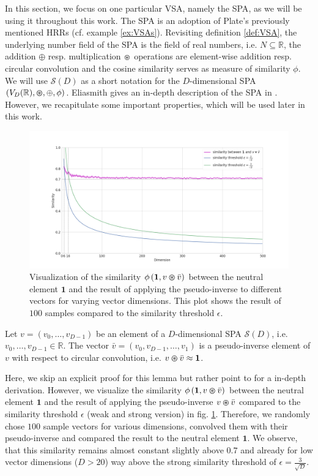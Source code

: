 In this section, we focus on one particular \ac{VSA}, namely the \ac{SPA}, as we will be using it throughout this work.
The \ac{SPA} is an adoption of Plate's previously mentioned \acp{HRR} (cf. example \ref{ex:VSAs}).
Revisiting definition \ref{def:VSA}, the underlying number field of the \ac{SPA} is the field of real numbers, i.e. $N \subseteq \mathbb{R}$, the addition $\oplus$ resp. multiplication $\varoast$ operations are element-wise addition resp. circular convolution and the cosine similarity serves as measure of similarity $\phi$.
We will use $\mathcal{S}(D)$ as a short notation for the $D$-dimensional \ac{SPA} $(V_{D}(\mathbb{R}), \varoast, \oplus, \phi)$.
Eliasmith gives an in-depth description of the \ac{SPA} in \cite{Eliasmith2013}.
However, we recapitulate some important properties, which will be used later in this work.
\begin{figure}[t!]
	\centering
	\includegraphics[width=1.0\textwidth]{imgs/pseudo_inverse_tsplot.png}
	\caption{Visualization of the similarity $\phi\left(\mathbf{1}, v \varoast \bar{v}\right)$ between the neutral element $\mathbf{1}$ and the result of applying the pseudo-inverse to different vectors for varying vector dimensions. This plot shows the result of $100$ samples compared to the similarity threshold $\epsilon$.}
	\label{fig:pseudo_inv}
\end{figure}
\begin{lemma}
	\label{lemma:spa_pseudo_inv}
	Let $v=\left(v_0, \ldots, v_{D-1}\right)$ be an element of a $D$-dimensional \ac{SPA} $\mathcal{S}(D)$, i.e. $v_0, \ldots, v_{D-1} \in \mathbb{R}$.
	The vector $\bar{v}=\left(v_0, v_{D-1}, \ldots, v_{1}\right)$ is a pseudo-inverse element of $v$ with respect to circular convolution, i.e. $v \varoast \bar{v} \approx \mathbf{1}$.
\end{lemma}
Here, we skip an explicit proof for this lemma but rather point to \cite[Section 3.1.2 and 3.1.3]{Plate1994} for a in-depth derivation.
However, we visualize the similarity $\phi\left(\mathbf{1}, v \varoast \bar{v}\right)$ between the neutral element $\mathbf{1}$ and the result of applying the pseudo-inverse $v \varoast \bar{v}$ compared to the similarity threshold $\epsilon$ (weak and strong version) in fig. \ref{fig:pseudo_inv}.
Therefore, we randomly chose $100$ sample vectors for various dimensions, convolved them with their pseudo-inverse and compared the result to the neutral element $\mathbf{1}$.
We observe, that this similarity remains almost constant slightly above $0.7$ and already for low vector dimensions ($D > 20$) way above the strong similarity threshold of $\epsilon=\frac{3}{\sqrt{D}}$.


